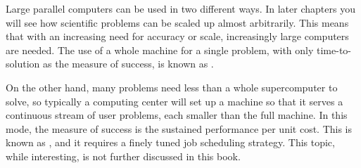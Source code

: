 
Large parallel computers can be used in two different ways. In later
chapters you will see how scientific problems can be scaled up almost
arbitrarily. This means that with an increasing need for accuracy or
scale, increasingly large computers are needed. The use of a whole
machine for a single problem, with only time-to-solution as the
measure of success, is known as .

On the other hand, many problems need less than a whole supercomputer
to solve, so typically a computing center will set up a machine so
that it serves a continuous stream of user problems, each
smaller than the full machine. In this mode, the measure of success is
the sustained performance per unit cost. This is known as
, and it requires a finely tuned job
scheduling strategy. This topic, while interesting, is not further
discussed in this book.
